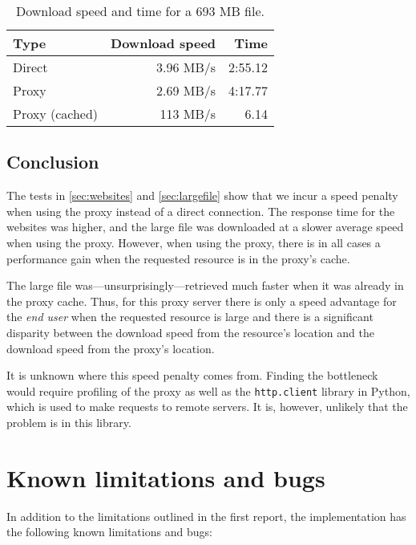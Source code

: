 \documentclass{sig-alternate}
\begin{document}
\begin{table}[h]
    \centering
    \begin{tabular}{|l||r|r|}
        \hline
        \bf{Type} & \bf{Download speed} & \bf{Time} \\
        \hline
        \hline
        Direct & 3.96 MB/s & 2:55.12 \\ \hline
        Proxy & 2.69 MB/s & 4:17.77 \\ \hline
        Proxy (cached) & 113 MB/s & 6.14 \\ \hline
    \end{tabular}
    \caption{Download speed and time for a 693 MB file.}
    \label{tbl:largefile}
\end{table}

\subsection{Conclusion}
\label{sec:testconclusions}

The tests in \autoref{sec:websites} and \autoref{sec:largefile} show that we
incur a speed penalty when using the proxy instead of a direct connection. The
response time for the websites was higher, and the large file was downloaded
at a slower average speed when using the proxy. However, when using the proxy,
there is in all cases a performance gain when the requested resource is in the
proxy's cache.

The large file was---unsurprisingly---retrieved much faster when it was
already in the proxy cache. Thus, for this proxy server there is only a
speed advantage for the \emph{end user} when the requested resource is large
and there is a significant disparity between the download speed from the
resource's location and the download speed from the proxy's location.

It is unknown where this speed penalty comes from. Finding the bottleneck
would require profiling of the proxy as well as the \verb+http.client+ library
in Python, which is used to make requests to remote servers. It is, however,
unlikely that the problem is in this library.


\section{Known limitations and bugs}
\label{sec:bugs}

In addition to the limitations outlined in the first report, the
implementation has the following known limitations and bugs:
\end{document}
